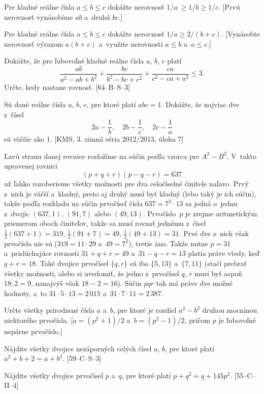 {
Pre kladné reálne čísla $a\le b \le c$ dokážte nerovnosť $1/a~\ge 1/b \ge
1/c$. [Prvú nerovnosť vynásobíme $ab$ a~druhú $bc$.]

Pre kladné reálne čísla $a\le b \le c$ dokážte nerovnosť $1/a\ge
2/(b+c)$. [Vynásobte nerovnosť výrazom $a(b+c)$ a~využite
nerovnosti $a\le b$ a~$a\le c$.]

\D
Dokážte, že pre ľubovoľné kladné reálne čísla $a$, $b$, $c$ platí
$$
\frac {ab} {a^2-ab+b^2}+\frac {bc} {b^2-bc+c^2}+\frac {ca} {c^2-ca+a^2} \le 3.
$$
Určte, kedy nastane rovnosť. [64--B--S--3]

Sú dané reálne čísla $a$, $b$, $c$, pre ktoré platí $abc = 1$. Dokážte, že
najviac dve z~čísel
$$
2a-\frac 1b,\quad 2b-\frac 1c,\quad 2c-\frac 1a
$$
sú väčšie ako 1. [KMS, 3. zimná séria 2012/2013, úloha 7]
}

{%
Ľavú stranu danej rovnice rozložíme na súčin
podľa vzorca pre $A^2-B^2$. V~takto upravenej rovnici
$$
(p+q+r)(p-q-r)=637
$$
už ľahko rozoberieme všetky možnosti pre dva celočíselné činitele naľavo.
Prvý z~nich je väčší a~kladný, preto aj druhý musí byť kladný (lebo taký je
ich súčin), takže podľa rozkladu na súčin prvočísel čísla
$637=7^2\cdot13$ sa jedná o~jednu z~dvojíc $(637, 1)$,
$(91, 7)$ alebo $(49, 13)$. Prvočíslo~$p$ je zrejme aritmetickým
priemerom oboch činiteľov, takže sa musí rovnať jednému z~čísel
$\frac12(637+1)=319$, $\frac12(91+7)=49$,
$\frac12(49+13)=31$. Prvé dve z~nich však prvočísla nie sú
($319=11\cdot29$ a~$49=7^2$), tretie áno.
Takže nutne $p=31$ a~prislúchajúce rovnosti $31+q+r=49$ a~$31-q-r=13$
platia práve vtedy, keď $q+r=18$. Také dvojice
prvočísel $\{q,r\}$ sú iba $\{5, 13\}$ a~$\{7, 11\}$ (stačí
prebrať všetky možnosti, alebo si uvedomiť, že jedno z~prvočísel
$q$, $r$ musí byť aspoň $18:2=9$, nanajvýš však $18-2=16$).
Súčin $pqr$ tak má práve dve možné hodnoty, a~to $31\cdot5\cdot13=2\,015$
a~$31\cdot7\cdot11=2\,387$.


Určte všetky prirodzené čísla $a$ a~$b$, pre ktoré je rozdiel
$a^2-b^2$ druhou mocninou niektorého prvočísla. [$a=(p^2+1)/2$
a~$b=(p^2-1)/2$, pričom $p$ je ľubovoľné nepárne prvočíslo.]

\D
Nájdite všetky dvojice nezáporných celých čísel $a$, $b$, pre ktoré platí
$a^2+b+2=a+b^2$. [59--C--S--3]

Nájdite všetky dvojice prvočísel $p$ a~$q$, pre ktoré platí
$p+q^{2}=q+145p^{2}$. [55--C--II--4]
}

